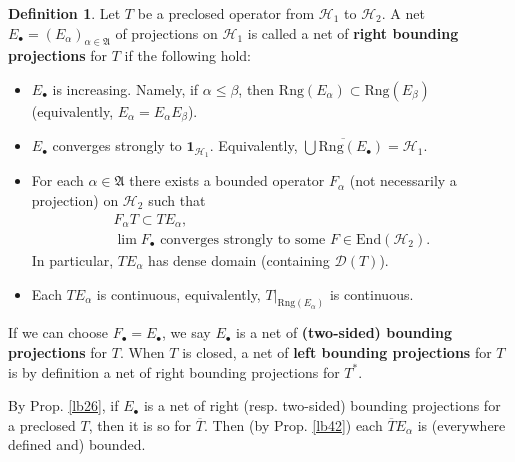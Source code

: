 \documentclass[12pt,a4paper,notitlepage]{article}
\theoremstyle{definition}
\newtheorem{df}{Definition}[section]
\theoremstyle{plain}
\newcommand{\fk}{\mathfrak}
\newcommand{\mc}{\mathcal}
\newcommand{\ovl}{\overline}
\newcommand{\End}{\mathrm{End}} %
\newcommand{\id}{\mathbf{1}}
\newcommand{\Dom}{\scr D}
\newcommand{\scr}{\mathscr}
\newcommand{\blt}{\bullet}
\newcommand{\Rng}{\mathrm{Rng}}
\numberwithin{equation}{section}
\begin{document}
\begin{df}\label{lb39}
Let $T$ be a preclosed operator from $\mc H_1$ to $\mc H_2$. A net $E_\blt=(E_\alpha)_{\alpha\in\fk A}$ of projections on $\mc H_1$ is called a net of \textbf{right bounding projections} for $T$ if the following hold:
\begin{itemize}
\item $E_\blt$ is increasing. Namely, if $\alpha\leq\beta$, then $\Rng(E_\alpha)\subset \Rng(E_\beta)$ (equivalently, $E_\alpha=E_\alpha E_\beta$). 
\item $E_\blt$ converges strongly to $\id_{\mc H_1}$. Equivalently, $\ovl{\bigcup \Rng(E_\blt)}=\mc H_1$.
\item For each $\alpha\in\fk A$ there exists a bounded operator $F_\alpha$ (not necessarily a projection) on $\mc H_2$ such that
\begin{gather*}
F_\alpha T\subset TE_\alpha,\\
\lim F_\blt \text{ converges strongly to some }F\in\End(\mc H_2).	
\end{gather*}
In particular, $TE_\alpha$ has dense domain (containing $\Dom(T)$).
\item Each $TE_\alpha$ is continuous, equivalently, $T|_{\Rng(E_\alpha)}$ is continuous.
\end{itemize}
If we can choose $F_\blt=E_\blt$,  we say $E_\blt$ is a net of \textbf{(two-sided) bounding projections} for $T$. When $T$ is closed, a net of \textbf{left bounding projections} for $T$ is by definition a net of right bounding projections for $T^*$.
\end{df}

By Prop. \ref{lb26}, if $E_\blt$ is a net of right (resp. two-sided) bounding projections for a preclosed $T$, then it is so for $\ovl T$. Then (by Prop. \ref{lb42}) each $\ovl TE_\alpha$ is (everywhere defined and) bounded.
\end{document}

